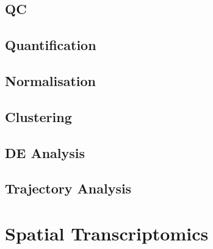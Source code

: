 \documentclass[aspectratio=169,11pt]{beamer}
\begin{document}
\subsection{QC}

\subsection{Quantification}

\subsection{Normalisation}

\subsection{Clustering}

\subsection{DE Analysis}

\subsection{Trajectory Analysis}

\section{Spatial Transcriptomics}
\end{document}
